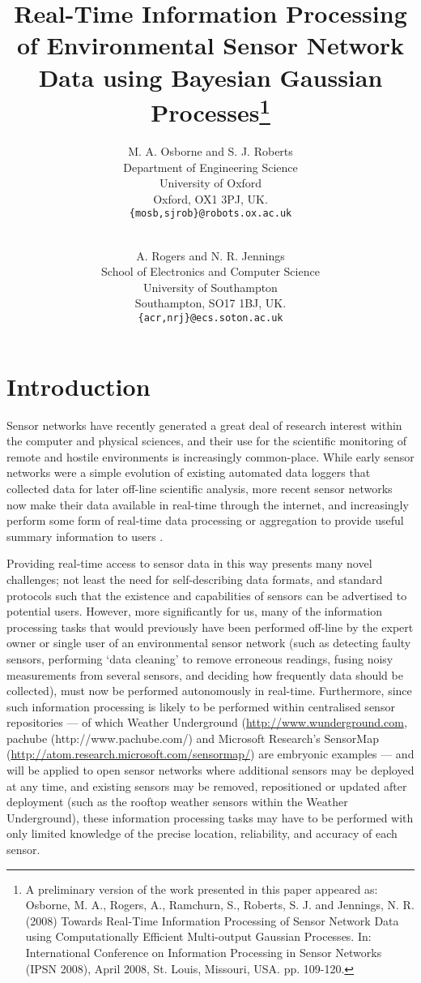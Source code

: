\documentclass{acmsmall}
\title{Real-Time Information Processing of Environmental Sensor Network Data using Bayesian Gaussian Processes\footnote{A preliminary version of the work presented in this paper appeared as: Osborne, M. A., Rogers, A., Ramchurn, S., Roberts, S. J. and Jennings, N. R. (2008) Towards Real-Time Information Processing of Sensor Network Data using Computationally Efficient Multi-output Gaussian Processes. In: International Conference on Information Processing in Sensor Networks (IPSN 2008), April 2008, St. Louis, Missouri, USA. pp. 109-120.}}
\author{M. A. Osborne and S. J. Roberts\\
Department of Engineering Science\\
University of Oxford\\
Oxford, OX1 3PJ, UK.\\
{\tt{\{mosb,sjrob\}@robots.ox.ac.uk}}\\
\and\\
A. Rogers and N. R. Jennings\\
School of Electronics and Computer Science\\
University of Southampton\\
Southampton, SO17 1BJ, UK.\\
{\tt{\{acr,nrj\}@ecs.soton.ac.uk}}\\
}
\begin{document}
\maketitle

\section{Introduction}

\noindent Sensor networks have recently generated a great deal of research interest within the computer and physical sciences, and their use for the scientific monitoring of remote and hostile environments is increasingly common-place. While early sensor networks were a simple evolution of existing automated data loggers that collected data for later off-line scientific analysis, more recent sensor networks now make their data available in real-time through the internet, and increasingly perform some form of real-time data processing or aggregation to provide useful summary information to users \cite{esn}.

Providing real-time access to sensor data in this way presents many novel challenges; not least the need for self-describing data formats, and standard protocols such that the existence and capabilities of sensors can be advertised to potential users. However, more significantly for us, many of the information processing tasks that would previously have been performed off-line by the expert owner or single user of an environmental sensor network (such as detecting faulty sensors, performing `data cleaning' to remove erroneous readings, fusing noisy measurements from several sensors, and deciding how frequently data should be collected), must now be performed autonomously in real-time. Furthermore, since such information processing is likely to be performed within centralised sensor repositories --- of which Weather Underground (\url{http://www.wunderground.com}, pachube (http://www.pachube.com/) and Microsoft Research's SensorMap (\url{http://atom.research.microsoft.com/sensormap/}) are embryonic examples --- and will be applied to open sensor networks where additional sensors may be deployed at any time, and existing sensors may be removed, repositioned or updated after deployment (such as the rooftop weather sensors within the Weather Underground), these information processing tasks may have to be performed with only limited knowledge of the precise location, reliability, and accuracy of each sensor.
\end{document}
